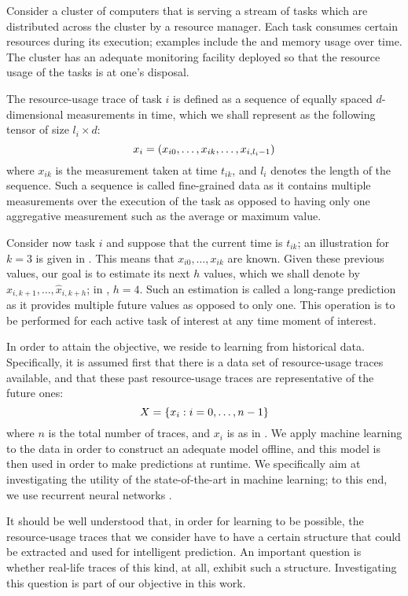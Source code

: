 Consider a cluster of computers that is serving a stream of tasks which are
distributed across the cluster by a resource manager. Each task consumes certain
resources during its execution; examples include the  and memory usage
over time. The cluster has an adequate monitoring facility deployed so that the
resource usage of the tasks is at one's disposal.

The resource-usage trace of task $i$ is defined as a sequence of equally spaced
$d$-dimensional measurements in time, which we shall represent as the following
tensor of size $l_i \times d$:
\begin{equation} \elab{trace}
  x_i = \left(x_{i0}, \dots, x_{ik}, \dots, x_{i,l_i - 1}\right)
\end{equation}
where $x_{ik}$ is the measurement taken at time $t_{ik}$, and $l_i$ denotes the
length of the sequence. Such a sequence is called fine-grained data as it
contains multiple measurements over the execution of the task as opposed to
having only one aggregative measurement such as the average or maximum value.

Consider now task $i$ and suppose that the current time is $t_{ik}$; an
illustration for $k = 3$ is given in . This means that $x_{i0},
\dots, x_{ik}$ are known. Given these previous values, our goal is to estimate
its next $h$ values, which we shall denote by $\hat{x}_{i,k + 1}, \dots,
\hat{x}_{i,k + h}$; in , $h = 4$. Such an estimation is called a
long-range prediction as it provides multiple future values as opposed to only
one. This operation is to be performed for each active task of interest at any
time moment of interest.

In order to attain the objective, we reside to learning from historical data.
Specifically, it is assumed first that there is a data set of resource-usage
traces available, and that these past resource-usage traces are representative
of the future ones:
\begin{equation} \elab{traces}
  X = \{ x_i: i = 0, \dots, n - 1 \}
\end{equation}
where $n$ is the total number of traces, and $x_i$ is as in . We
apply machine learning to the data in order to construct an adequate model
offline, and this model is then used in order to make predictions at runtime. We
specifically aim at investigating the utility of the state-of-the-art in machine
learning; to this end, we use recurrent neural networks \cite{goodfellow2016}.

It should be well understood that, in order for learning to be possible, the
resource-usage traces that we consider have to have a certain structure that
could be extracted and used for intelligent prediction. An important question is
whether real-life traces of this kind, at all, exhibit such a structure.
Investigating this question is part of our objective in this work.

